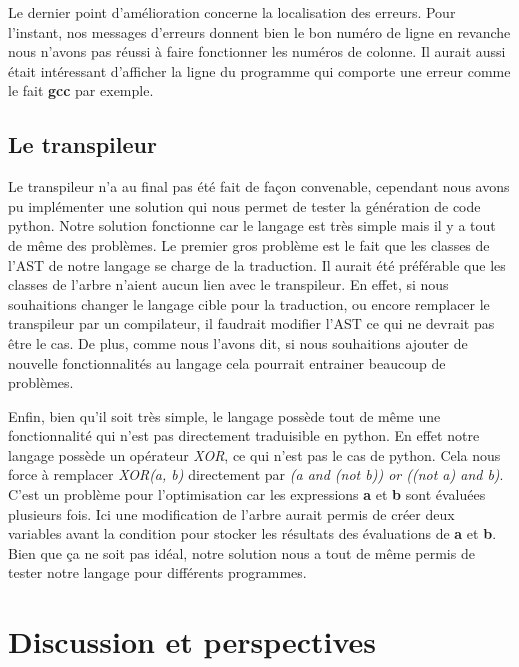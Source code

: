 \documentclass[a4paper]{article}%
\begin{document}
Le dernier point d'amélioration concerne la localisation des erreurs. Pour
l'instant, nos messages d'erreurs donnent bien le bon numéro de ligne en
revanche nous n'avons pas réussi à faire fonctionner les numéros de colonne. Il
aurait aussi était intéressant d'afficher la ligne du programme qui comporte une
erreur comme le fait \textbf{gcc} par exemple.\\


\subsection{Le transpileur}

Le transpileur n'a au final pas été fait de façon convenable, cependant nous
avons pu implémenter une solution qui nous permet de tester la génération de
code python. Notre solution fonctionne car le langage est très simple mais il y
a tout de même des problèmes. Le premier gros problème est le fait que les
classes de l'AST de notre langage se charge de la traduction. Il aurait été
préférable que les classes de l'arbre n'aient aucun lien avec le transpileur. En
effet, si nous souhaitions changer le langage cible pour la traduction, ou
encore remplacer le transpileur par un compilateur, il faudrait modifier l'AST
ce qui ne devrait pas être le cas. De plus, comme nous l'avons dit, si nous
souhaitions ajouter de nouvelle fonctionnalités au langage cela pourrait
entrainer beaucoup de problèmes.

Enfin, bien qu'il soit très simple, le langage possède tout de même une
fonctionnalité qui n'est pas directement traduisible en python. En effet notre
langage possède un opérateur \textit{XOR}, ce qui n'est pas le cas de python.
Cela nous force à remplacer \textit{XOR(a, b)} directement par \textit{(a and
(not b)) or ((not a) and b)}. C'est un problème pour l'optimisation car les
expressions \textbf{a} et \textbf{b} sont évaluées plusieurs fois. Ici une
modification de l'arbre aurait permis de créer deux variables avant la condition
pour stocker les résultats des évaluations de \textbf{a} et \textbf{b}.\\

Bien que ça ne soit pas idéal, notre solution nous a tout de même permis de
tester notre langage pour différents programmes.


\section{Discussion et perspectives}
\end{document}
